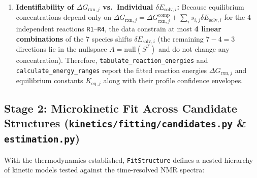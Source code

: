 \documentclass[11pt,a4paper]{article}
\begin{document}
\begin{enumerate}[leftmargin=1.8em]
    \item \textbf{Identifiability of $\Delta G_{\text{rxn}, j}$ vs.\ Individual $\delta E_{\text{solv}, i}$:}
    Because equilibrium concentrations depend only on $\Delta G_{\text{rxn}, j} = \Delta G_{\text{rxn}, j}^{\text{comp}} + \sum_i s_{i,j} \delta E_{\text{solv}, i}$ for the 4 independent reactions \texttt{R1}--\texttt{R4}, the data constrain at most \textbf{4 linear combinations} of the 7 species shifts $\delta E_{\text{solv}, i}$ (the remaining $7 - 4 = 3$ directions lie in the nullspace $A = \text{null}(S^T)$ and do not change any concentration). Therefore, \texttt{tabulate\_\allowbreak{}reaction\_\allowbreak{}energies} and \texttt{calculate\_\allowbreak{}energy\_\allowbreak{}ranges} report the fitted reaction energies $\Delta G_{\text{rxn}, j}$ and equilibrium constants $K_{\text{eq}, j}$ along with their profile confidence envelopes.
\end{enumerate}

\subsection{Stage 2: Microkinetic Fit Across Candidate Structures (\texttt{kinetics/\allowbreak{}fitting/\allowbreak{}candidates.py} \& \texttt{estimation.py})}

With the thermodynamics established, \texttt{FitStructure} defines a nested hierarchy of kinetic models tested against the time-resolved NMR spectra:
\end{document}
